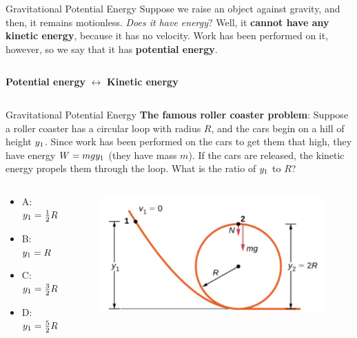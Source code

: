 \documentclass{beamer}
\begin{document}
\begin{frame}{Gravitational Potential Energy}
Suppose we raise an object against gravity, and then, it remains motionless.  \textit{Does it have energy}?  Well, it \textbf{cannot have any kinetic energy}, because it has no velocity.  Work has been performed on it, however, so we say that it has \textbf{potential energy}. \\ \vspace{1cm}
\begin{columns}[T]
\begin{column}{0.8\textwidth}
\centering
\textbf{\alert{Potential energy}} $\leftrightarrow$ \textbf{\alert{Kinetic energy}}
\end{column}
\end{columns}
\end{frame}

\begin{frame}{Gravitational Potential Energy}
\textbf{The famous roller coaster problem}: Suppose a roller coaster has a circular loop with radius $R$, and the cars begin on a hill of height $y_{\rm 1}$.  Since work has been performed on the cars to get them that high, they have energy $W = mgy_{\rm 1}$ (they have mass $m$).  If the cars are released, the kinetic energy propels them through the loop.  What is the ratio of $y_{\rm 1}$ to $R$?
\begin{columns}[T]
\begin{column}{0.5\textwidth}
\begin{itemize}
\item A: $y_{\rm 1} = \frac{1}{2}R$
\item B: $y_{\rm 1} = R$
\item C: $y_{\rm 1} = \frac{3}{2}R$
\item D: $y_{\rm 1} = \frac{5}{2}R$
\end{itemize}
\end{column}
\begin{column}{0.5\textwidth}
\begin{figure}
\centering
\includegraphics[width=\textwidth]{figures/loop.png}
\end{figure}
\end{column}
\end{columns}
\end{frame}
\end{document}
